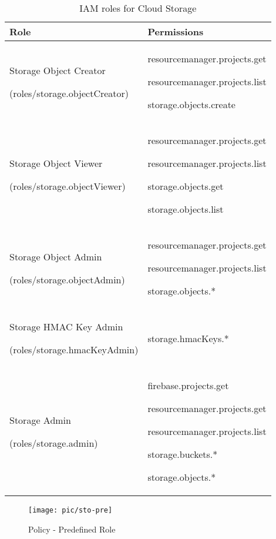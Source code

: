 \begin{table}[t]
  \begin{center}
  \begin{tabular}{|p{4cm}|p{4cm}|}
  \hline
  Role & Permissions\\
  \hline
  \hline
  Storage Object Creator\par(roles/storage.objectCreator) &  resourcemanager.projects.get  \par resourcemanager.projects.list \par storage.objects.create \\ %
  \hline
  Storage Object Viewer\par(roles/storage.objectViewer) & resourcemanager.projects.get\par resourcemanager.projects.list\par storage.objects.get\par storage.objects.list \\ %
  \hline
  Storage Object Admin\par(roles/storage.objectAdmin) & resourcemanager.projects.get \par resourcemanager.projects.list\par storage.objects.*\\ %
  \hline
  Storage HMAC Key Admin\par(roles/storage.hmacKeyAdmin) &storage.hmacKeys.*\\
  \hline
   Storage Admin\par(roles/storage.admin) &firebase.projects.get\par resourcemanager.projects.get\par resourcemanager.projects.list\par storage.buckets.*\par storage.objects.*\\
  \hline
  \end{tabular}
  \caption{IAM roles for Cloud Storage}
  \vspace{-0.20in}
  \label{table:sto-role}
  \end{center}
\end{table}

\begin{figure}[h]
\centering
\texttt{[image: pic/sto-pre]}
\caption {Policy - Predefined Role}
 \label{fig:sto-pre}
\end{figure}

